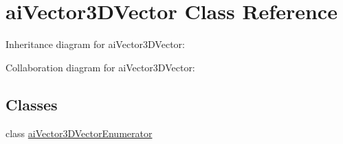 \hypertarget{classai_vector3_d_vector}{\section{ai\+Vector3\+D\+Vector Class Reference}
\label{classai_vector3_d_vector}
}


Inheritance diagram for ai\+Vector3\+D\+Vector\+:


Collaboration diagram for ai\+Vector3\+D\+Vector\+:
\subsection*{Classes}
\begin{DoxyCompactItemize}
\item 
class \hyperlink{classai_vector3_d_vector_1_1ai_vector3_d_vector_enumerator}{ai\+Vector3\+D\+Vector\+Enumerator}
\end{DoxyCompactItemize}
